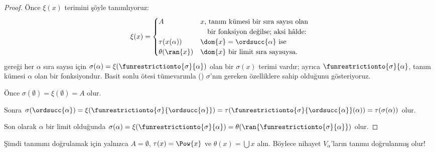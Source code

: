 \begin{proof}
Önce $\xi(x)$ terimini şöyle tanımlıyoruz:
\[
	\xi(x) =
	\begin{cases}
			A &\text{$x$, tanım kümesi bir sıra sayısı olan}\\
			&\hspace{1em}\text{bir fonksiyon değilse; aksi hâlde:}\\
			\tau(x(\alpha)) & \text{$\dom{x} = \ordsucc{\alpha}$ ise}\\
			\theta(\ran{x}) & \text{$\dom{x}$ bir limit sıra sayısıysa.}
	\end{cases}
\]
 gereği her $\alpha$ sıra sayısı için
$\sigma(\alpha)=\xi(\funrestrictionto{\sigma}{\alpha})$ olan bir
$\sigma(x)$ terimi vardır; ayrıca
$\funrestrictionto{\sigma}{\alpha}$, tanım kümesi $\alpha$ olan bir
fonksiyondur. Basit sonlu ötesi tümevarımla
() $\sigma$'nın gereken
özelliklere sahip olduğunu gösteriyoruz.

Önce $\sigma(\emptyset)=\xi(\emptyset)=A$ olur.

Sonra $\sigma(\ordsucc{\alpha})=
\xi(\funrestrictionto{\sigma}{\ordsucc{\alpha}})=
\tau(\funrestrictionto{\sigma}{\ordsucc{\alpha}}(\alpha))=
\tau(\sigma(\alpha))$ olur.

Son olarak $\alpha$ bir limit olduğunda
$\sigma(\alpha)=\xi(\funrestrictionto{\sigma}{\alpha})=
\theta(\ran{\funrestrictionto{\sigma}{\alpha}})$ olur.
\end{proof}
\noindent
Şimdi  tanımını doğrulamak için yalnızca
$A=\emptyset$, $\tau(x)=\Pow{x}$ ve $\theta(x)=\bigcup x$ alın. Böylece
nihayet $V_\alpha$'ların tanımı doğrulanmış olur!{}

